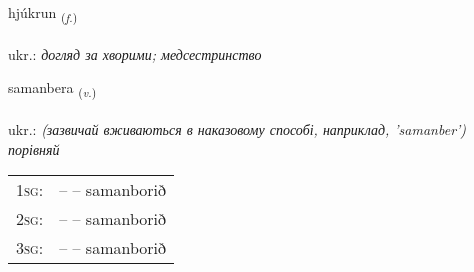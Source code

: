 \documentclass[frontgrid, backgrid]{flacards}\usepackage[]{graphicx}\usepackage[]{xcolor}
\begin{document}
\renewcommand{\flhead}{\vskip5pt \fboxsep=0pt {\small\bfseries\footnotesize Nafnorð | іменник}}
\renewcommand{\fcfoot}{\vskip5pt \fboxsep=0pt \hspace{2pt}{\small\bfseries\footnotesize 3K}}

\renewcommand{\blhead}{\vskip5pt {\small\bfseries\footnotesize Nafnorð | іменник }}
\renewcommand{\bcfoot}{\vskip5pt \hspace{2pt}{\small\bfseries\footnotesize 3K}}


{hjúkrun \small{\textsubscript{(\textit{f.})}} \\[1ex] %
\textphonetic{[çuːkrʏn]} \\
ukr.: \emph{догляд за хворими; медсестринство} \\  [2ex]
\renewcommand*{\arraystretch}{0.8}
}

\renewcommand{\flhead}{\vskip5pt \fboxsep=0pt {\small\bfseries\footnotesize Sagnorð | дієслово}}
\renewcommand{\fcfoot}{\vskip5pt \fboxsep=0pt \hspace{2pt}{\small\bfseries\footnotesize 3K}}

\renewcommand{\blhead}{\vskip5pt {\small\bfseries\footnotesize Sagnorð | дієслово }}
\renewcommand{\bcfoot}{\vskip5pt \hspace{2pt}{\small\bfseries\footnotesize 3K}}


{samanbera \small{\textsubscript{(\textit{v.})}} \\[1ex] %
\textphonetic{[saːmanpɛra]} \\
ukr.: \emph{(зазвичай вживаються в наказовому способі, наприклад, 'samanber') порівняй} \\  [2ex]
\renewcommand*{\arraystretch}{0.8}
\begin{tabular}{p{1cm}l}
\textsc{1sg}: &  --  -- samanborið \\ 
\textsc{2sg}: &  --  -- samanborið \\ 
\textsc{3sg}: &  --  -- samanborið \\ 
\end{tabular}
}
\end{document}
